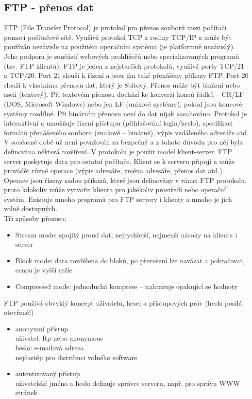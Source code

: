 \documentclass[10pt,a4paper]{article}
\begin{document}
\subsection{FTP - přenos dat}
FTP (File Transfer Protocol) je protokol pro přenos souborů mezi počítači pomocí počítačové sítě. Využívá protokol TCP z rodiny TCP/IP a může být používán nezávisle na použitém operačním systému (je platformně nezávislý). Jeho podpora je součástí webových prohlížečů nebo specializovaných programů (tzv. FTP klientů). FTP je jeden z nejstarších protokolů, využívá porty TCP/21 a TCP/20. Port 21 slouží k řízení a jsou jím také přenášeny příkazy FTP. Port 20 slouží k vlastnímu přenosu dat, který je 8bitový. Přenos může být binární nebo ascii (textový). Při textovém přenosu dochází ke konverzi konců řádků – CR/LF (DOS, Microsoft Windows) nebo jen LF (unixové systémy), pokud jsou koncové systémy rozdílné. Při binárním přenosu není do dat nijak zasahováno. Protokol je interaktivní a umožňuje řízení přístupu (přihlašování login/heslo), specifikaci formátu přenášeného souboru (znakově – binárně), výpis vzdáleného adresáře atd. V současné době už není považován za bezpečný a z tohoto důvodu pro něj byla definována některá rozšíření. V protokolu je použit model klient-server. FTP server poskytuje data pro ostatní počítače. Klient se k serveru připojí a může provádět různé operace (výpis adresáře, změna adresáře, přenos dat atd.). Operace jsou řízeny sadou příkazů, které jsou definovány v rámci FTP protokolu, proto kdokoliv může vytvořit klienta pro jakékoliv prostředí nebo operační systém. Existuje mnoho programů pro FTP servery i klienty a mnoho je jich volně dostupných. \\
Tři způsoby přenosu:
\begin{itemize}
	\item Stream mode: spojitý proud dat, nejrychlejší, nejmenší nároky na klienta i server
	\item Block mode: data rozdělena do bloků, po přerušení lze navázat a pokračovat, cenou je vyšší režie
	\item Compressed mode: jednoduchá komprese – nahrazuje opakující se hodnoty
\end{itemize}
FTP používá obvyklý koncept uživatelů, hesel a přístupových práv (hesla posílá otevřeně!)
\begin{itemize}
	\item anonymní přístup \\
	uživatel: ftp nebo anonymous \\
	heslo: e-mailová adresa \\
	nejčastěji pro distribuci volného software
	\item autentizovaný přístup \\
	uživatelské jméno a heslo definuje správce serveru, např. pro správu WWW stránek
\end{itemize}
\end{document}
